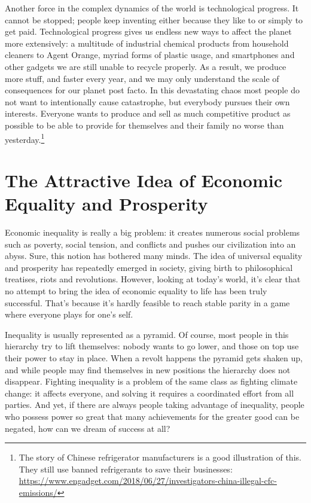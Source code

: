 \documentclass[12pt]{report}
\begin{document}
\noindent Another force in the complex dynamics of the world is technological progress. It cannot be stopped; people keep inventing either because they like to or simply to get paid. Technological progress gives us endless new ways to affect the planet more extensively: a multitude of industrial chemical products from household cleaners to Agent Orange, myriad forms of plastic usage, and smartphones and other gadgets we are still unable to recycle properly. As a result, we produce more stuff, and faster every year, and we may only understand the scale of consequences for our planet post facto. In this devastating chaos most people do not want to intentionally cause catastrophe, but everybody pursues their own interests. Everyone wants to produce and sell as much competitive product as possible to be able to provide for themselves and their family no worse than yesterday.\footnote{The story of Chinese refrigerator manufacturers is a good illustration of this. They still use banned refrigerants to save their businesses: \url{https://www.engadget.com/2018/06/27/investigators-china-illegal-cfc-emissions/}}

\section*{The Attractive Idea of Economic Equality and Prosperity}

Economic inequality is really a big problem: it creates numerous social problems such as poverty, social tension, and conflicts and pushes our civilization into an abyss. Sure, this notion has bothered many minds. The idea of universal equality and prosperity has repeatedly emerged in society, giving birth to philosophical treatises, riots and revolutions. However, looking at today’s world, it’s clear that no attempt to bring the idea of economic equality to life has been truly successful. That’s because it’s hardly feasible to reach stable parity in a game where everyone plays for one’s self.

\noindent Inequality is usually represented as a pyramid. Of course, most people in this hierarchy try to lift themselves: nobody wants to go lower, and those on top use their power to stay in place. When a revolt happens the pyramid gets shaken up, and while people may find themselves in new positions the hierarchy does not disappear. Fighting inequality is a problem of the same class as fighting climate change: it affects everyone, and solving it requires a coordinated effort from all parties. And yet, if there are always people taking advantage of inequality, people who possess power so great that many achievements for the greater good can be negated, how can we dream of success at all?
\end{document}
